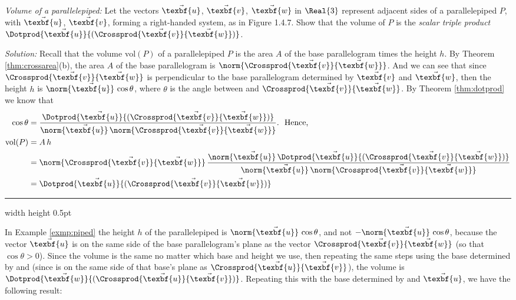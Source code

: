 \begin{exmp}\label{exmp:piped}
 \emph{Volume of a parallelepiped:} Let the vectors $\vec{\texbf{u}}$, $\vec{\texbf{v}}$, $\vec{\texbf{w}}$ in $\Real{3}$ represent adjacent
 sides of a parallelepiped $P$, with $\vec{\texbf{u}}$, $\vec{\texbf{v}}$,  forming a right-handed system,
 as in Figure 1.4.7. Show that the volume of $P$ is the
 \emph{scalar triple product}
 $\Dotprod{\vec{\texbf{u}}}{(\Crossprod{\vec{\texbf{v}}}{\vec{\texbf{w}}})}$.
 \par\noindent \emph{Solution:} Recall that the volume $\text{vol}(P)$ of a parallelepiped $P$ is the area $A$ of the base parallelogram
 times the height $h$. By Theorem \ref{thm:crossarea}(b), the area $A$ of the base parallelogram is
 $\norm{\Crossprod{\vec{\texbf{v}}}{\vec{\texbf{w}}}}$. And we can see that since $\Crossprod{\vec{\texbf{v}}}{\vec{\texbf{w}}}$ is
 perpendicular to the base parallelogram determined by $\vec{\texbf{v}}$ and $\vec{\texbf{w}}$, then the height $h$ is
 $\norm{\vec{\texbf{u}}}\,\cos \theta$, where $\theta$ is the angle between  and
 $\Crossprod{\vec{\texbf{v}}}{\vec{\texbf{w}}}$. By Theorem \ref{thm:dotprod} we know that
 \begin{align*}
  \cos \theta &= \frac{\Dotprod{\vec{\texbf{u}}}{(\Crossprod{\vec{\texbf{v}}}{\vec{\texbf{w}}})}}{\norm{\vec{\texbf{u}}} \,
  \norm{\Crossprod{\vec{\texbf{v}}}{\vec{\texbf{w}}}}}. \text{~~Hence,}\\
  \text{vol}(P) &= A \, h\\
  &= \norm{\Crossprod{\vec{\texbf{v}}}{\vec{\texbf{w}}}} \,
  \frac{\norm{\vec{\texbf{u}}} \, \Dotprod{\vec{\texbf{u}}}{(\Crossprod{\vec{\texbf{v}}}{\vec{\texbf{w}}})}}{\norm{\vec{\texbf{u}}} \,
  \norm{\Crossprod{\vec{\texbf{v}}}{\vec{\texbf{w}}}}}\\
  &= \Dotprod{\vec{\texbf{u}}}{(\Crossprod{\vec{\texbf{v}}}{\vec{\texbf{w}}})}
 \end{align*}
\end{exmp}
\hrule width \textwidth height 0.5pt
\vspace{4mm}

In Example \ref{exmp:piped} the height $h$ of the parallelepiped is $\norm{\vec{\texbf{u}}}\,\cos \theta$, and not
$-\norm{\vec{\texbf{u}}}\,\cos \theta$, because the vector $\vec{\texbf{u}}$ is on the same side of the base parallelogram's plane
as the vector $\Crossprod{\vec{\texbf{v}}}{\vec{\texbf{w}}}$ (so that $\cos \theta > 0$). Since the volume
is the same no matter which base and height we use, then repeating the same steps using
the base determined by  and  (since  is on the same side of that base's
plane as $\Crossprod{\vec{\texbf{u}}}{\vec{\texbf{v}}}$), the volume is
$\Dotprod{\vec{\texbf{w}}}{(\Crossprod{\vec{\texbf{u}}}{\vec{\texbf{v}}})}$. Repeating this with the base determined by  and
$\vec{\texbf{u}}$, we have the following result:\vspace{2mm}

